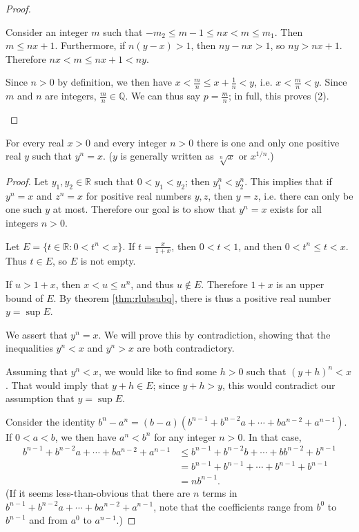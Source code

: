 \documentclass[12pt]{article}
\begin{document}
\begin{thm}
\begin{proof}
\begin{enumerate}
        Consider an integer $m$ such that $-m_2 \leq m - 1 \leq nx < m \leq m_1$.
        Then $m \leq nx + 1$. Furthermore, if $n(y - x) > 1$, then $ny - nx > 1$, so
        $ny > nx + 1$. Therefore $nx < m \leq nx + 1 < ny$.

        Since $n > 0$ by definition, we then have $x < \frac{m}{n} \leq x +
        \frac{1}{n} < y$, i.e. $x < \frac{m}{n} < y$. Since $m$ and $n$ are integers,
        $\frac{m}{n} \in \mathbb{Q}$. We can thus say $p = \frac{m}{n}$; in full,
        this proves (2).
    \end{enumerate}
  \end{proof}
\end{thm}

\begin{thm} \label{thm:uniqrealroots}
  For every real $x > 0$ and every integer $n > 0$ there is one and only one positive
  real $y$ such that $y^n = x$. ($y$ is generally written as $\sqrt[n]{x}$ or
  $x^{1/n}$.)

  \begin{proof}
    Let $y_1,y_2 \in \mathbb{R}$ such that $0 < y_1 < y_2$; then $y_1^n < y_2^n$.
    This implies that if $y^n = x$ and $z^n = x$ for positive real numbers $y,z$,
    then $y = z$, i.e. there can only be one such $y$ at most. Therefore our goal is
    to show that $y^n = x$ exists for all integers $n > 0$.

    Let $E = \{t \in \mathbb{R}: 0 < t^n < x\}$. If $t = \frac{x}{1 + x}$, then $0
    < t < 1$, and then $0 < t^n \leq t < x$. Thus $t \in E$, so $E$ is not empty.

    If $u > 1 + x$, then $x < u \leq u^n$, and thus $u \notin E$. Therefore $1 + x$
    is an upper bound of $E$. By theorem \ref{thm:rlubsubq}, there is thus a positive
    real number $y = \sup E$.

    We assert that $y^n = x$. We will prove this by contradiction, showing that the
    inequalities $y^n < x$ and $y^n > x$ are both contradictory.

    Assuming that $y^n < x$, we would like to find some $h > 0$ such that $(y + h)^n
    < x$. That would imply that $y + h \in E$; since $y + h > y$, this would
    contradict our assumption that $y = \sup E$.

    Consider the identity $b^n - a^n = (b - a)(b^{n - 1} + b^{n - 2}a + \cdots +
    ba^{n - 2} + a^{n - 1})$. If $0 < a < b$, we then have $a^n < b^n$ for any
    integer $n > 0$. In that case,
    \begin{align*}
      b^{n - 1} + b^{n - 2}a + \cdots + ba^{n - 2} + a^{n - 1}
      &\leq b^{n - 1} + b^{n - 2}b + \cdots + bb^{n - 2} + b^{n - 1}\\
      &= b^{n - 1} + b^{n - 1} + \cdots + b^{n - 1} + b^{n - 1}\\
      &= nb^{n - 1}.
    \end{align*}
    (If it seems less-than-obvious that there are $n$ terms in $b^{n - 1} + b^{n - 2}a
    + \cdots + ba^{n - 2} + a^{n - 1}$, note that the coefficients range from
    $b^0$ to $b^{n - 1}$ and from $a^0$ to $a^{n - 1}$.)


\end{proof}
\end{thm}
\end{document}
